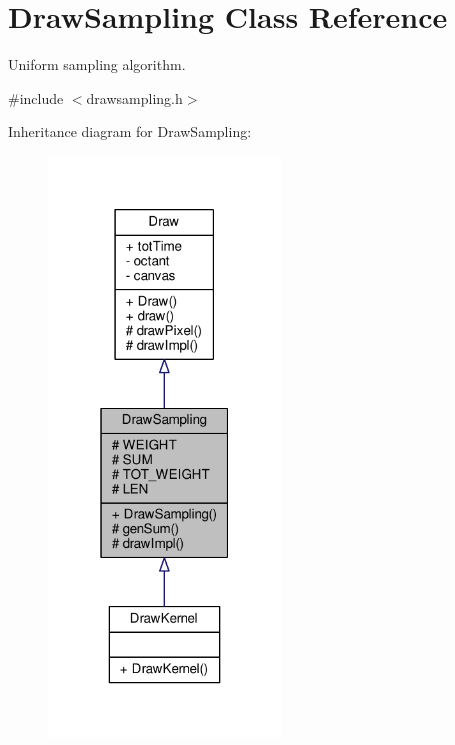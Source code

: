 \hypertarget{classDrawSampling}{}\section{Draw\+Sampling Class Reference}
\label{classDrawSampling}


Uniform sampling algorithm.  




{\ttfamily \#include $<$drawsampling.\+h$>$}



Inheritance diagram for Draw\+Sampling\+:\nopagebreak
\begin{figure}[H]
\begin{center}
\leavevmode
\includegraphics[width=175pt]{classDrawSampling__inherit__graph}
\end{center}
\end{figure}


